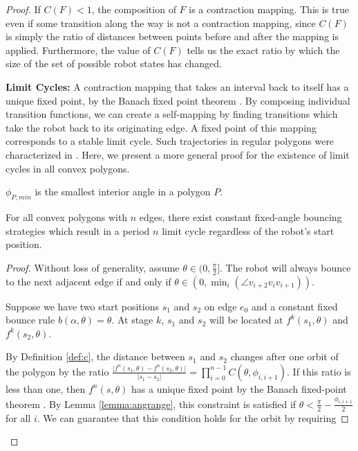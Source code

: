 \documentclass[]{styles/svproc}  %
\begin{document}
\begin{proof}
If $C(F) < 1$, the composition of $F$ is a contraction mapping. This is true even if some transition along
the way is not a
contraction mapping, since $C(F)$ is simply the ratio of distances
between points before and after the mapping is applied. Furthermore, the value
of $C(F)$ tells us the exact ratio by which the
size of the set of possible robot states has changed.

\textbf{Limit Cycles:} A contraction mapping that takes an interval back
to itself has a unique fixed point, by the Banach fixed point
theorem \cite{Granas2003}. By composing individual transition functions, 
we can create a self-mapping 
by finding transitions which take the robot back to its originating edge. A fixed
point of this mapping corresponds to a stable limit cycle.
Such trajectories in regular polygons were characterized in \cite{NilBecLav17}.
Here, we present a more general proof for the existence of limit cycles in all
convex polygons.

\begin{definition}
$\phi_{P,min}$ is the smallest interior angle in a polygon $P$.
\end{definition}

\begin{theorem} \label{thm:convex}
For all convex polygons with $n$ edges, there exist constant fixed-angle bouncing
strategies which result in a period $n$ limit cycle regardless of the robot's start position.
\end{theorem}
\begin{proof}

Without loss of generality, assume $\theta \in (0, \frac{\pi}{2}]$. The robot will always bounce
to the next adjacent edge if and only if
$\theta \in (0, \min_{i}(\angle v_{i+2}v_{i}v_{i+1}))$.

Suppose we have two start positions $s_1$ and $s_2$ on edge $e_0$ and a constant fixed bounce 
rule $b(\alpha, \theta) = \theta$.
At stage $k$, $s_1$ and $s_2$ will be located at $f^{k}(s_1,\theta)$ and
$f^{k}(s_2,\theta)$. 

By Definition \ref{def:c}, the distance between $s_1$ and $s_2$ changes after one orbit of the polygon by the
ratio $\frac{\lvert f^{n}(s_1, \theta) - f^{n}(s_2, \theta) \rvert}{ \lvert s_1
- s_2 \rvert } = \prod_{i = 0}^{n-1}
C(\theta, \phi_{i, i+1})$. If this ratio is less than one, then $f^n(s,\theta)$ has a unique fixed point by the Banach fixed-point theorem
\cite{Granas2003}. By Lemma \ref{lemma:angrange}, this constraint is satisfied if  
$\theta < \frac{\pi}{2}-\frac{\phi_{i, i+1}}{2}$ for all $i$. We can guarantee that this
condition holds for the orbit by requiring


\end{proof}
\end{proof}
\end{document}
